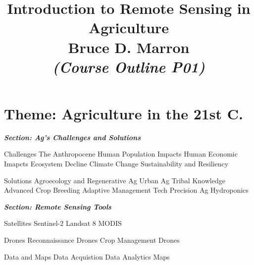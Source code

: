\documentclass[12pt, letterpaper]{article}
\title{\vspace{-5mm}\fontsize{14pt}{12pt}
                    \selectfont \textbf{Introduction to Remote Sensing in Agriculture}\\  %
                   \vspace{2mm}
                   Bruce D. Marron \\
                   \vspace{2mm}
                   \textit{(Course Outline P01)}
      }
\author{
     \vspace{-20mm}
}
\date{}
\begin{document}
\begin{singlespacing}
\maketitle                                      %
\end{singlespacing}
\thispagestyle{fancy}                            %


\section{Theme: Agriculture in the 21st C.}

\large
\begin{flushleft}
\textbf{\textit{Section: Ag's Challenges and Solutions}}
\end{flushleft}
\normalsize

\begin{outline}[enumerate]
\1 Challenges
\2 The Anthropocene
\3 Human Population Impacts
\3 Human Economic Imapcts
\2 Ecosystem Decline
\2 Climate Change
\2 Sustainability and Resiliency

\1 Solutions
\2 Agroecology and Regenerative Ag
\2 Urban Ag
\2 Tribal Knowledge
\2 Advanced Crop Breeding
\2 Adaptive Management
\2 Tech
\3 Precision Ag
\3 Hydroponics
\3 


\end{outline}


\large
\begin{flushleft}
\textbf{\textit{Section: Remote Sensing Tools}}
\end{flushleft}
\normalsize

\begin{outline}[enumerate]

\1 Satellites
\2 Sentinel-2
\2 Landsat 8
\2 MODIS

\1 Drones
\2 Reconnaissance Drones
\2 Crop Management Drones

\1 Data and Maps
\2 Data Acquistion
\3 Data Analytics
\2 Maps

\end{outline}
\end{document}
